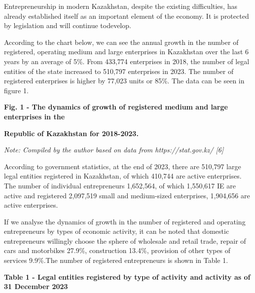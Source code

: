 \begin{multicols}{2}
Entrepreneurship in modern Kazakhstan, despite the existing
difficulties, has already established itself as an important element of
the economy. It is protected by legislation and will continue todevelop.

According to the chart below, we can see the annual growth in the number
of registered, operating medium and large enterprises in Kazakhstan over
the last 6 years by an average of 5\%. From 433,774 enterprises in 2018,
the number of legal entities of the state increased to 510,797
enterprises in 2023. The number of registered enterprises is higher by
77,023 units or 85\%. The data can be seen in figure 1.
\end{multicols}

{\bfseries Fig. 1 - The dynamics of growth of registered medium and large
enterprises in the}

{\bfseries Republic of Kazakhstan for 2018-2023.}

\emph{Note: Compiled by the author based on data from
https://stat.gov.kz/ {[}6{]}}

\begin{multicols}{2}
According to government statistics, at the end of 2023, there are
510,797 large legal entities registered in Kazakhstan, of which 410,744
are active enterprises. The number of individual entrepreneurs
1,652,564, of which 1,550,617 IE are active and registered 2,097,519
small and medium-sized enterprises, 1,904,656 are active enterprises.

If we analyse the dynamics of growth in the number of registered and
operating entrepreneurs by types of economic activity, it can be noted
that domestic entrepreneurs willingly choose the sphere of wholesale and
retail trade, repair of cars and motorbikes 27.9\%, construction 13.4\%,
provision of other types of services 9.9\%.The number of registered
entrepreneurs is shown in Table 1.
\end{multicols}

{\bfseries Table 1 - Legal entities registered by type of activity and
activity as of 31 December 2023}

